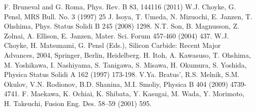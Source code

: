      F. Bruneval and G. Roma, Phys. Rev. B 83, 144116 (2011)
     W.J. Choyke, G. Pensl, MRS Bull. No. 3 (1997) 25
     J. Isoya, T. Umeda, N. Mizuochi, E. Janzen, T. Ohshima, Phys. Status Solidi B 245 (2008) 1298. 
     N.T. Son, B. Magnusson, Z. Zolnai, A. Ellison, E. Janzen, Mater. Sci. Forum 457-460 (2004) 437.
     W.J. Choyke, H. Matsunami, G. Pensl (Eds.), Silicon Carbide: Recent Major Advances, 2004, Springer, Berlin, Heidelberg.
     H. Itoh, A. Kawasuso, T. Ohshima, M. Yoshikawa, I. Nashiyama, S. Tanigawa, S. Misawa, H. Okumura, S. Yoshida, Physica Status Solidi A 162 (1997) 173-198.
     V.Ya. Bratus’, R.S. Melnik, S.M. Okulov, V.N. Rodionov, B.D. Shanina, M.I. Smoliy, Physica B 404 (2009) 4739-4741.
     F. Maekawa, K. Ochiai, K. Shibata, Y. Kasugai, M. Wada, Y. Morimoto, H. Takeuchi, Fusion Eng. Des. 58–59 (2001) 595.

